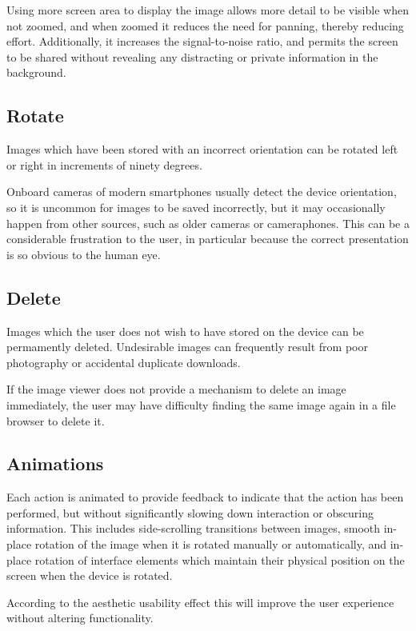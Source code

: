 \documentclass[a4paper,11pt]{article}
\begin{document}
Using more screen area to display the image allows more detail to be visible when not zoomed, and when zoomed it reduces the need for panning, thereby reducing effort.  Additionally, it increases the signal-to-noise ratio, and permits the screen to be shared without revealing any distracting or private information in the background.

\subsection{Rotate}

Images which have been stored with an incorrect orientation can be rotated left or right in increments of ninety degrees.

Onboard cameras of modern smartphones usually detect the device orientation, so it is uncommon for images to be saved incorrectly, but it may occasionally happen from other sources, such as older cameras or cameraphones.  This can be a considerable frustration to the user, in particular because the correct presentation is so obvious to the human eye.

\subsection{Delete}

Images which the user does not wish to have stored on the device can be permamently deleted.  Undesirable images can frequently result from poor photography or accidental duplicate downloads.

If the image viewer does not provide a mechanism to delete an image immediately, the user may have difficulty finding the same image again in a file browser to delete it.

\subsection{Animations}

Each action is animated to provide feedback to indicate that the action has been performed, but without significantly slowing down interaction or obscuring information.   This includes side-scrolling transitions between images, smooth in-place rotation of the image when it is rotated manually or automatically, and in-place rotation of interface elements which maintain their physical position on the screen when the device is rotated.

According to the aesthetic usability effect this will improve the user experience without altering functionality.
\end{document}
